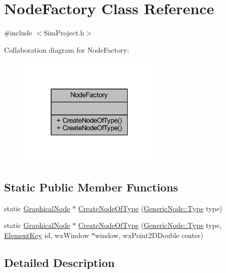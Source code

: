 \hypertarget{class_node_factory}{}\section{Node\+Factory Class Reference}
\label{class_node_factory}


{\ttfamily \#include $<$Sim\+Project.\+h$>$}



Collaboration diagram for Node\+Factory\+:
\nopagebreak
\begin{figure}[H]
\begin{center}
\leavevmode
\includegraphics[width=193pt]{class_node_factory__coll__graph}
\end{center}
\end{figure}
\subsection*{Static Public Member Functions}
\begin{DoxyCompactItemize}
\item 
static \hyperlink{class_graphical_node}{Graphical\+Node} $\ast$ \hyperlink{class_node_factory_ae55ad09e7b24522328a979fce9ac5e2a}{Create\+Node\+Of\+Type} (\hyperlink{class_generic_node_a9e7985ab9bbfa1c85091adc0ab71a6b6}{Generic\+Node\+::\+Type} type)
\item 
static \hyperlink{class_graphical_node}{Graphical\+Node} $\ast$ \hyperlink{class_node_factory_a152f41696a5206529e5c2981fefcdf55}{Create\+Node\+Of\+Type} (\hyperlink{class_generic_node_a9e7985ab9bbfa1c85091adc0ab71a6b6}{Generic\+Node\+::\+Type} type, \hyperlink{_graphical_element_8h_ade5fd6c85839a416577ff9de1605141e}{Element\+Key} id, wx\+Window $\ast$window, wx\+Point2\+D\+Double center)
\end{DoxyCompactItemize}


\subsection{Detailed Description}


